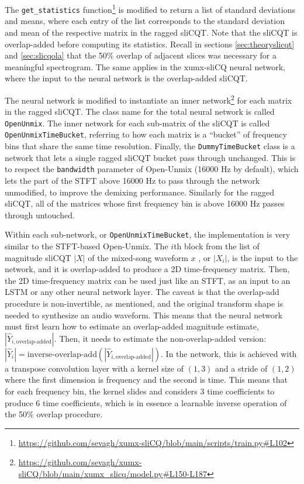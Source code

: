 \documentclass[report.tex]{subfiles}
\begin{document}
\begin{tight_enumerate}
	\item
		The \Verb#get_statistics# function\footnote{\url{https://github.com/sevagh/xumx-sliCQ/blob/main/scripts/train.py\#L102}} is modified to return a list of standard deviations and means, where each entry of the list corresponds to the standard deviation and mean of the respective matrix in the ragged sliCQT. Note that the sliCQT is overlap-added before computing its statistics. Recall in sections \ref{sec:theoryslicqt} and \ref{sec:slicqola} that the 50\% overlap of adjacent slices was necessary for a meaningful spectrogram. The same applies in the xumx-sliCQ neural network, where the input to the neural network is the overlap-added sliCQT.
	\item
		The neural network is modified to instantiate an inner network\footnote{\url{https://github.com/sevagh/xumx-sliCQ/blob/main/xumx_slicq/model.py\#L150-L187}} for each matrix in the ragged sliCQT. The class name for the total neural network is called \Verb#OpenUnmix#. The inner network for each sub-matrix of the sliCQT is called \Verb#OpenUnmixTimeBucket#, referring to how each matrix is a ``bucket'' of frequency bins that share the same time resolution. Finally, the \Verb#DummyTimeBucket# class is a network that lets a single ragged sliCQT bucket pass through unchanged. This is to respect the \Verb#bandwidth# parameter of Open-Unmix (16000 Hz by default), which lets the part of the STFT above 16000 Hz to pass through the network unmodified, to improve the demixing performance. Similarly for the ragged sliCQT, all of the matrices whose first frequency bin is above 16000 Hz passes through untouched.
	\item
		Within each sub-network, or \Verb#OpenUnmixTimeBucket#, the implementation is very similar to the STFT-based Open-Unmix. The $i$th block from the list of magnitude sliCQT $|X|$ of the mixed-song waveform $x$ , or $|X_{i}|$, is the input to the network, and it is overlap-added to produce a 2D time-frequency matrix. Then, the 2D time-frequency matrix can be used just like an STFT, as an input to an LSTM or any other neural network layer. The caveat is that the overlap-add procedure is non-invertible, as mentioned, and the original transform shape is needed to synthesize an audio waveform. This means that the neural network must first learn how to estimate an overlap-added magnitude estimate, $|\hat{Y}_{i, \text{overlap-added}}|$. Then, it needs to estimate the non-overlap-added version: $|\hat{Y}_{i}| = \text{inverse-overlap-add}(|\hat{Y}_{i, \text{overlap-added}}|)$. In the network, this is achieved with a transpose convolution layer with a kernel size of $(1, 3)$ and a stride of $(1, 2)$ where the first dimension is frequency and the second is time. This means that for each frequency bin, the kernel slides and considers 3 time coefficients to produce 6 time coefficients, which is in essence a learnable inverse operation of the 50\% overlap procedure.

\end{tight_enumerate}
\end{document}
